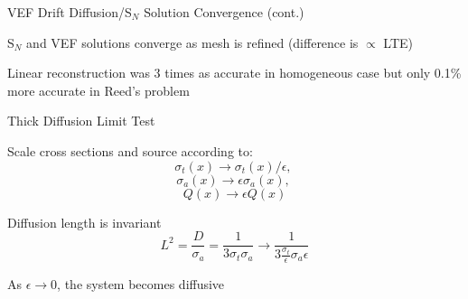 \documentclass[10pt]{beamer}
\newcommand{\SN}{S$_N$\xspace}
\begin{document}
\begin{frame}{VEF Drift Diffusion/\SN Solution Convergence (cont.)}
	\pause
	\vspace{-.15in}

	\SN and VEF solutions converge as mesh is refined (difference is $\propto$ LTE)

	\pause
	Linear reconstruction was 3 times as accurate in homogeneous case but only 0.1\% more accurate in Reed's problem 

\end{frame}

\begin{frame}{Thick Diffusion Limit Test}

	Scale cross sections and source according to:
	$$ \sigma_t(x) \rightarrow \sigma_t(x)/\epsilon, \ $$
	$$ \sigma_a(x) \rightarrow \epsilon \sigma_a(x), \ $$
	$$ Q(x) \rightarrow \epsilon Q(x) $$

	Diffusion length is invariant 
	\begin{equation*}
		L^2 = \frac{D}{\sigma_a} = \frac{1}{3\sigma_t\sigma_a} \rightarrow
			\frac{1}{3 \frac{\sigma_t}{\epsilon} \sigma_a \epsilon}
	\end{equation*}

	As $\epsilon \rightarrow 0$, the system becomes diffusive 

\end{frame}
\end{document}
